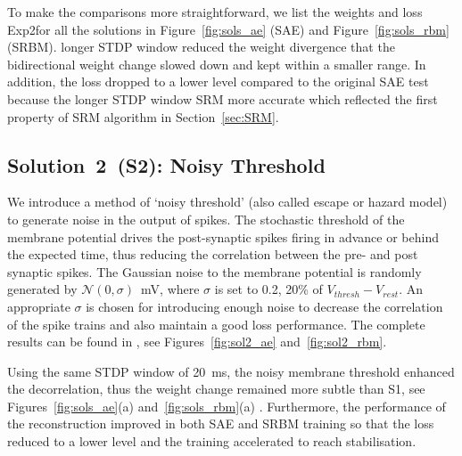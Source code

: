 To make the comparisons more straightforward, we list the weights and loss \DIFdelbegin {}\DIFdelend \DIFaddbegin {}\DIFaddend Exp2\DIFaddbegin {}\DIFaddend for all the solutions in Figure~\ref{fig:sols_ae} (SAE) and Figure~\ref{fig:sols_rbm} (SRBM).
\DIFdelbegin {}\DIFdelend \DIFaddbegin {}\DIFaddend longer STDP window reduced the weight divergence that the bidirectional weight change slowed down and kept within a smaller range.
In addition, the loss dropped to a lower level compared to the original SAE test because the longer STDP window \DIFdelbegin {}\DIFdelend \DIFaddbegin {}\DIFaddend SRM more accurate which reflected \DIFdelbegin {}\DIFdelend the first property of \DIFaddbegin {}\DIFaddend SRM algorithm in Section~\ref{sec:SRM}.



\subsection{Solution~2~(S2): Noisy Threshold}
We introduce a method of `noisy threshold' (also called escape or hazard model)~\citep{gerstner2002spiking} to generate noise in the output of spikes.
The stochastic threshold of the membrane potential drives the post-synaptic spikes firing in advance or behind the expected time, thus reducing the correlation between the pre- and post synaptic spikes.
The Gaussian noise \DIFdelbegin {}\DIFdelend \DIFaddbegin {}\DIFaddend to the membrane potential is randomly generated by $\mathcal{N}(0, \sigma)$~mV, where $\sigma$ is set to 0.2, 20\% of $V_{thresh} - V_{rest}.$
An appropriate $\sigma$ is chosen for introducing enough noise to decrease the correlation of the spike trains and also maintain a good loss performance.
The complete \DIFdelbegin {}\DIFdelend \DIFaddbegin {}\DIFaddend results can be found in \DIFdelbegin {}\DIFdelend \DIFaddbegin {}\DIFaddend , see Figures~\ref{fig:sol2_ae} and~\ref{fig:sol2_rbm}.

Using the same STDP window \DIFdelbegin {}\DIFdelend \DIFaddbegin {}\DIFaddend of 20~ms, the noisy membrane threshold enhanced the decorrelation, thus the weight change remained more subtle than S1, see Figures~\ref{fig:sols_ae}(a) and~\ref{fig:sols_rbm}(a) .
Furthermore, the performance of the reconstruction improved in both SAE and SRBM training so that the loss reduced to a lower level and the training accelerated to reach stabilisation. %


